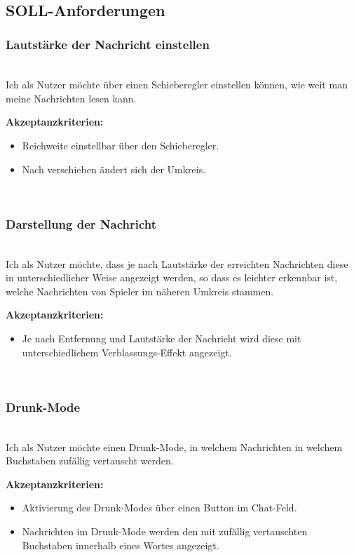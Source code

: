 \documentclass[conference]{IEEEtran}
\begin{document}
	\ \\
	\subsection{SOLL-Anforderungen}
	\subsubsection{Lautstärke der Nachricht einstellen}
	\ \\
	Ich als Nutzer möchte über einen Schieberegler einstellen können, wie weit man meine Nachrichten lesen kann.
	
	\textbf{Akzeptanzkriterien:}
	\begin{itemize}
		\item Reichweite einstellbar über den Schieberegler.
		\item Nach verschieben ändert sich der Umkreis.
	\end{itemize}
	\ \\
	
	\subsubsection{Darstellung der Nachricht}
	\ \\
	Ich als Nutzer möchte, dass je nach Lautstärke der erreichten Nachrichten diese in unterschiedlicher Weise angezeigt werden, so dass es leichter erkennbar ist, welche Nachrichten von Spieler im näheren Umkreis stammen.
	
	\textbf{Akzeptanzkriterien:}
	\begin{itemize}
		\item Je nach Entfernung und Lautstärke der Nachricht wird diese mit unterschiedlichem Verblassungs-Effekt angezeigt.
	\end{itemize}
	\ \\

	\subsubsection{Drunk-Mode}
	\ \\
	Ich als Nutzer möchte einen Drunk-Mode, in welchem Nachrichten in welchem Buchstaben zufällig vertauscht werden.
	
	\textbf{Akzeptanzkriterien:}
	\begin{itemize}
		\item Aktivierung des Drunk-Modes über einen Button im Chat-Feld.
		\item Nachrichten im Drunk-Mode werden den mit zufällig vertauschten Buchstaben innerhalb eines Wortes angezeigt.
	\end{itemize}
	
\end{document}
